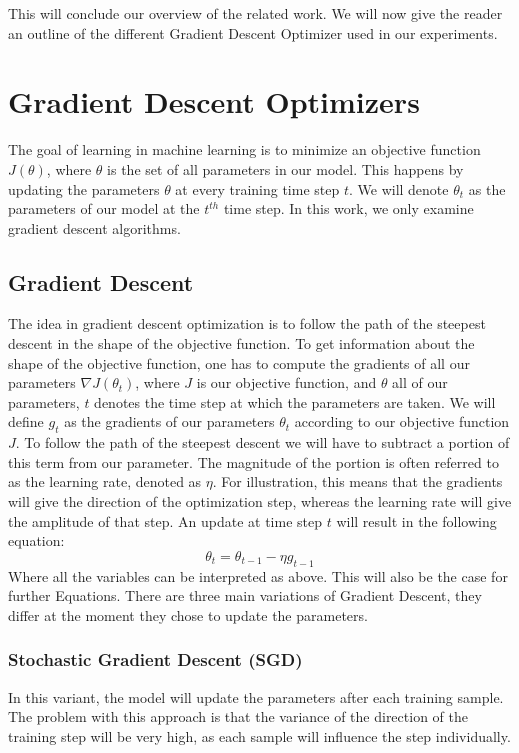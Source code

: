 This will conclude our overview of the related work. We will now give the reader an outline of the different Gradient Descent Optimizer used in our experiments.
\section{Gradient Descent Optimizers} \label{optimizers}
The goal of learning in machine learning is to minimize an objective function $J(\theta)$, where $\theta$ is the set of all parameters in our model. This happens by updating the parameters $\theta$ at every training time step $t$. We will denote $\theta_{t}$ as the parameters of our model at the $t^{th}$ time step. In this work, we only examine gradient descent algorithms.
\subsection{Gradient Descent}
The idea in gradient descent optimization is to follow the path of the steepest descent in the shape of the objective function. To get information about the shape of the objective function, one has to compute the gradients of all our parameters $\nabla J(\theta_{t})$, where $J$ is our objective function, and $\theta$ all of our parameters, $t$ denotes the time step at which the parameters are taken. We will define $g_{t}$ as the gradients of our parameters $\theta_t$ according to our objective function $J$. To follow the path of the steepest descent we will have to subtract a portion of this term from our parameter. The magnitude of the portion is often referred to as the learning rate, denoted as $\eta$. For illustration, this means that the gradients will give the direction of the optimization step, whereas the learning rate will give the amplitude of that step. An update at time step $t$ will result in the following equation:
\begin{equation}
\theta_t = \theta_{t-1} - \eta g_{t-1}
\end{equation}
Where all the variables can be interpreted as above. This will also be the case for further Equations.
There are three main variations of Gradient Descent, they differ at the moment they chose to update the parameters.
\subsubsection{Stochastic Gradient Descent (SGD)}
In this variant, the model will update the parameters after each training sample. The problem with this approach is that the variance of the direction of the training step will be very high, as each sample will influence the step individually.

